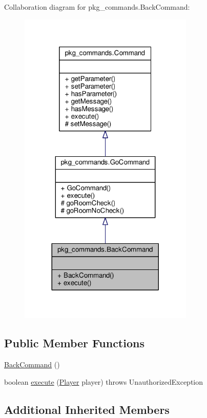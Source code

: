 Collaboration diagram for pkg\-\_\-commands.\-Back\-Command\-:
\nopagebreak
\begin{figure}[H]
\begin{center}
\leavevmode
\includegraphics[width=236pt]{classpkg__commands_1_1BackCommand__coll__graph}
\end{center}
\end{figure}
\subsection*{Public Member Functions}
\begin{DoxyCompactItemize}
\item 
\hyperlink{classpkg__commands_1_1BackCommand_a81518eb89a9e9126e51f2f7ba6ff1ed9}{Back\-Command} ()
\item 
boolean \hyperlink{classpkg__commands_1_1BackCommand_a35bf0276436a619d7baeb9c3a752f9d6}{execute} (\hyperlink{classpkg__world_1_1Player}{Player} player)  throws Unauthorized\-Exception 
\end{DoxyCompactItemize}
\subsection*{Additional Inherited Members}



